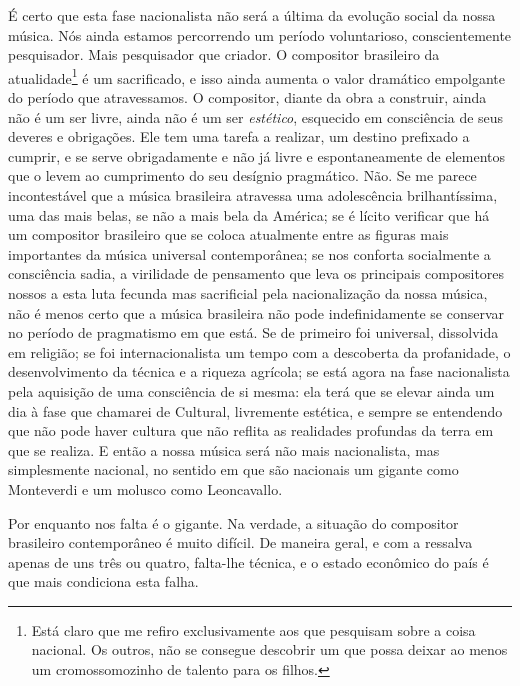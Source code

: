 É certo que esta fase nacionalista não será a última da evolução social
da nossa música. Nós ainda estamos percorrendo um período voluntarioso,
conscientemente pesquisador. Mais pesquisador que criador. O compositor
brasileiro da atualidade\footnote{Está claro que me refiro exclusivamente aos que pesquisam sobre a
coisa nacional. Os outros, não se consegue descobrir um que possa deixar
ao menos um cromossomozinho de talento para os filhos.} é um sacrificado, e isso ainda aumenta o
valor dramático empolgante do período que atravessamos. O compositor,
diante da obra a construir, ainda não é um ser livre, ainda não é um ser
\textit{estético}, esquecido em consciência de seus deveres e obrigações. Ele
tem uma tarefa a realizar, um destino prefixado a cumprir, e se serve
obrigadamente e não já livre e espontaneamente de elementos que o levem
ao cumprimento do seu desígnio pragmático. Não. Se me parece
incontestável que a música brasileira atravessa uma adolescência
brilhantíssima, uma das mais belas, se não a mais bela da América; se é
lícito verificar que há um compositor brasileiro que se coloca
atualmente entre as figuras mais importantes da música universal
contemporânea; se nos conforta socialmente a consciência sadia, a
virilidade de pensamento que leva os principais compositores nossos a
esta luta fecunda mas sacrificial pela nacionalização da nossa música,
não é menos certo que a música brasileira não pode indefinidamente se
conservar no período de pragmatismo em que está. Se de primeiro foi
universal, dissolvida em religião; se foi internacionalista um tempo com
a descoberta da profanidade, o desenvolvimento da técnica e a riqueza
agrícola; se está agora na fase nacionalista pela aquisição de uma
consciência de si mesma: ela terá que se elevar ainda um dia à fase que
chamarei de Cultural, livremente estética, e sempre se entendendo que
não pode haver cultura que não reflita as realidades profundas da terra
em que se realiza. E então a nossa música será não mais nacionalista,
mas simplesmente nacional, no sentido em que são nacionais um gigante
como Monteverdi e um molusco como Leoncavallo.

Por enquanto nos falta é o gigante. Na verdade, a situação do compositor
brasileiro contemporâneo é muito difícil. De maneira geral, e com a
ressalva apenas de uns três ou quatro, falta-lhe técnica, e o estado
econômico do país é que mais condiciona esta falha.


